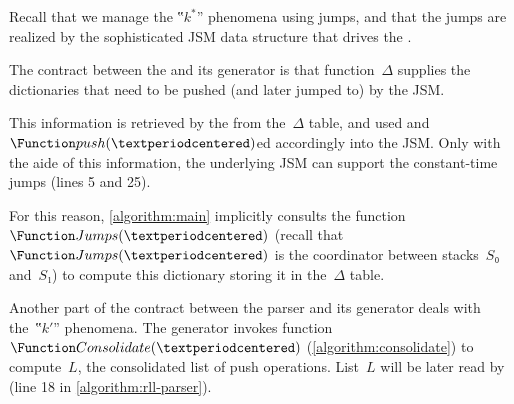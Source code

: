Recall that we manage the ‟$k^*$” phenomena using jumps, and that the
jumps are realized by the sophisticated JSM data structure that drives the
\RLLp.

The contract between the \RLLp and its generator is that function~$Δ$
supplies the dictionaries that need to be pushed (and later jumped to)
by the JSM.

This information is retrieved by the \RLLp from the~$Δ$ table,
and used and~$\Function push(·)$ed accordingly into the JSM.
Only with the aide of this information, the underlying JSM can support the
constant-time jumps (lines 5 and 25).

For this reason, \cref{algorithm:main} implicitly consults the function~$\Function Jumps(·)$
(recall that~$\Function Jumps(·)$ is the coordinator between stacks~$S₀$ and~$S₁$)
to compute this dictionary storing it in the~$Δ$ table.

Another part of the contract between the parser and its generator deals
with the~‟$k'$” phenomena. The generator invokes function~$\Function
Consolidate(·)$ (\cref{algorithm:consolidate}) to
compute~$L$, the consolidated list of push operations. List~$L$ will be later
read by \RLLp (line 18 in \cref{algorithm:rll-parser}).
